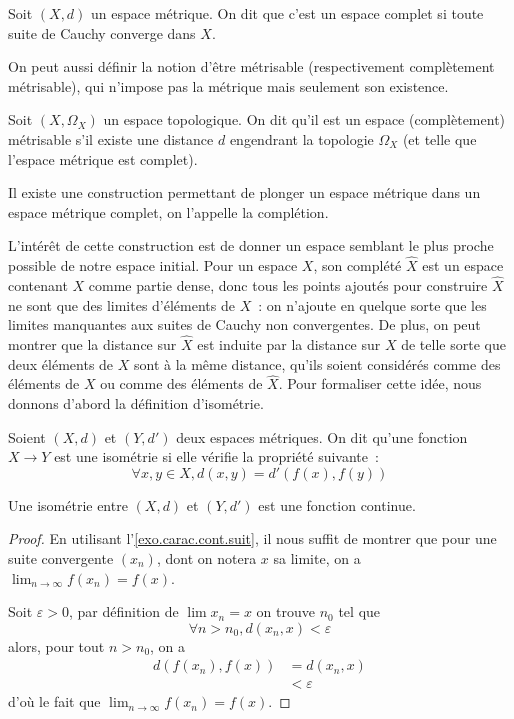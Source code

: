 \begin{definition}
  Soit $(X,d)$ un espace métrique. On dit que c'est un espace complet si toute
  suite de Cauchy converge dans $X$.
\end{definition}

On peut aussi définir la notion d'être métrisable (respectivement complètement
métrisable), qui n'impose pas la métrique mais seulement son existence.

\begin{definition}
  Soit $(X,\Omega_X)$ un espace topologique. On dit qu'il est un espace
  (complètement) métrisable s'il existe une distance $d$ engendrant la topologie
  $\Omega_X$ (et telle que l'espace métrique est complet).
\end{definition}

Il existe une construction permettant de plonger un espace métrique dans un
espace métrique complet, on l'appelle la complétion.

L'intérêt de cette construction est de donner un espace semblant le plus proche
possible de notre espace initial. Pour un espace $X$, son complété $\hat X$ est
un espace contenant $X$ comme partie dense, donc tous les points ajoutés pour
construire $\hat X$ ne sont que des limites d'éléments de $X$~: on n'ajoute en
quelque sorte que les limites manquantes aux suites de Cauchy non convergentes.
De plus, on peut montrer que la distance sur $\hat X$ est induite par la
distance sur $X$ de telle sorte que deux éléments de $X$ sont à la même
distance, qu'ils soient considérés comme des éléments de $X$ ou comme des
éléments de $\hat X$. Pour formaliser cette idée, nous donnons d'abord la
définition d'isométrie.

\begin{definition}[Isométrie]
  Soient $(X,d)$ et $(Y,d')$ deux espaces métriques. On dit qu'une fonction
  $X \to Y$ est une isométrie si elle vérifie la propriété suivante~:
  \[\forall x,y \in X, d(x,y) = d'(f(x),f(y))\]
\end{definition}

\begin{property}
  Une isométrie entre $(X,d)$ et $(Y,d')$ est une fonction continue.
\end{property}

\begin{proof}
  En utilisant l'\cref{exo.carac.cont.suit},
  il nous suffit de montrer que pour une suite convergente $(x_n)$, dont on
  notera $x$ sa limite, on a $\displaystyle\lim_{n \to \infty} f(x_n) = f(x)$.

  Soit $\varepsilon > 0$, par définition de $\lim x_n = x$ on trouve $n_0$ tel
  que
  \[\forall n > n_0, d(x_n,x) < \varepsilon\]
  alors, pour tout $n > n_0$, on a
  \begin{align*}
    d(f(x_n),f(x)) &= d(x_n,x)\\
    &< \varepsilon
  \end{align*}
  d'où le fait que $\displaystyle\lim_{n\to\infty} f(x_n) = f(x)$.
\end{proof}

